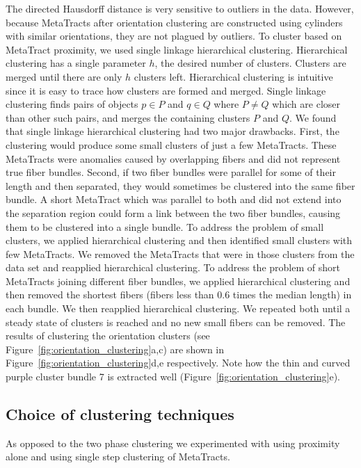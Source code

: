 The directed Hausdorff distance is very sensitive to outliers in the data.
However, because MetaTracts after orientation clustering are constructed using cylinders with similar orientations, they are not plagued by outliers.
To cluster based on MetaTract proximity, we used single linkage hierarchical clustering.
Hierarchical clustering has a single parameter $h$, the desired number of clusters.
Clusters are merged until there are only $h$ clusters left.
Hierarchical clustering is intuitive since it is easy to trace how clusters are formed and merged.
Single linkage clustering finds pairs of objects $p \in P$ and $q \in Q$ where $P \neq Q$ which are closer than other such pairs, and merges the containing clusters $P$ and $Q$.
We found that single linkage hierarchical clustering had two major drawbacks.
First, the clustering would produce some small clusters of just a few MetaTracts.
These MetaTracts were anomalies caused by overlapping fibers and did not represent true fiber bundles.
Second, if two fiber bundles were parallel for some of their length and then separated, they would sometimes be clustered into the same fiber bundle.
A short MetaTract which was parallel to both and did not extend into the separation region could form a link between the two fiber bundles, causing them to be clustered into a single bundle.
To address the problem of small clusters, we applied hierarchical clustering and then identified small clusters with few MetaTracts.
We removed the MetaTracts that were in those clusters from the data set and reapplied hierarchical clustering.
To address the problem of short MetaTracts joining different fiber bundles, we applied hierarchical clustering and then removed the
shortest fibers (fibers less than 0.6 times the median length) in each bundle. We then reapplied hierarchical clustering.
We repeated both until a steady state of clusters is reached and no new small fibers can be removed. The results of clustering the orientation clusters (see Figure~\ref{fig:orientation_clustering}a,c) are shown in Figure~\ref{fig:orientation_clustering}d,e respectively. Note how the thin and curved purple cluster bundle 7 is extracted well (Figure~\ref{fig:orientation_clustering}e). 


\subsection{Choice of clustering techniques}
As opposed to the two phase clustering we experimented with using proximity alone and using single step clustering of MetaTracts.
  
